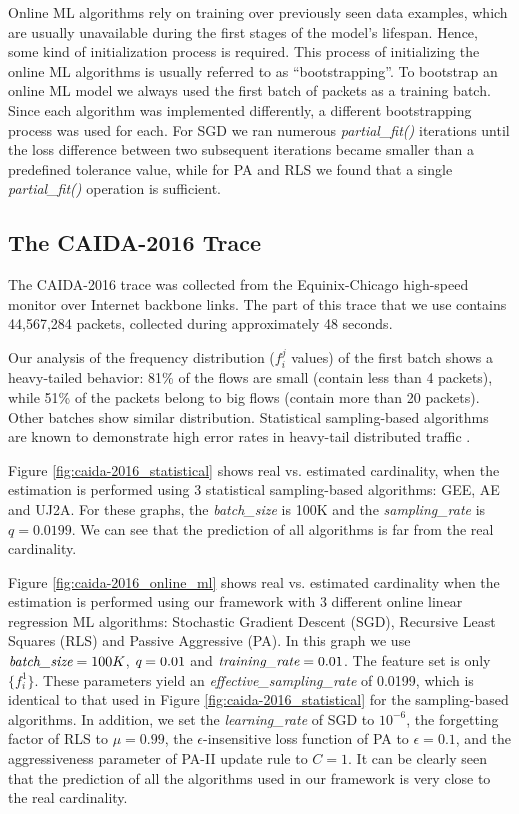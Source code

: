 			Online ML algorithms rely on training over previously seen data examples, which are usually unavailable during the first stages of the model's lifespan. Hence, some kind of initialization process is required. This process of initializing the online ML algorithms is usually referred to as ``bootstrapping''. To bootstrap an online ML model we always used the first batch of packets as a training batch. Since each algorithm was implemented differently, a different bootstrapping process was used for each. For SGD we ran numerous \emph{partial\_fit()} iterations until the loss difference between two subsequent iterations became smaller than a predefined tolerance value, while for PA and RLS we found that a single \emph{partial\_fit()} operation is sufficient.

	\subsection{The CAIDA-2016 Trace} \label{subsec:caida-2016}
		
		The CAIDA-2016 \cite{caidabackbone2016} trace was collected from the Equinix-Chicago high-speed monitor over Internet backbone links. The part of this trace that we use contains 44,567,284 packets, collected during approximately 48 seconds.
		
		Our analysis of the frequency distribution ($f_i^j$ values) of the first batch shows a heavy-tailed behavior: 81\% of the flows are small (contain less than 4 packets), while 51\% of the packets belong to big flows (contain more than 20 packets). Other batches show similar distribution. Statistical sampling-based algorithms are known to demonstrate high error rates in heavy-tail distributed traffic \cite{charikar2000towards, haas1998estimating}.
		
		Figure \ref{fig:caida-2016_statistical} shows real vs. estimated cardinality, when the estimation is performed using 3 statistical sampling-based algorithms: GEE, AE and UJ2A. For these graphs, the \emph{batch\_size} is 100K and the \emph{sampling\_rate} is $q=0.0199$. We can see that the prediction of all algorithms is far from the real cardinality.

		Figure \ref{fig:caida-2016_online_ml} shows real vs. estimated cardinality when the estimation is performed using our framework with 3 different online linear regression ML algorithms: Stochastic Gradient Descent (SGD), Recursive Least Squares (RLS) and Passive Aggressive (PA). In this graph we use $\emph{batch\_size}=100K$, $\emph{q}=0.01$ and $\emph{training\_rate}=0.01$. The feature set is only $\{f_i^1\}$. These parameters yield an \emph{effective\_sampling\_rate} of 0.0199, which is identical to that used in Figure \ref{fig:caida-2016_statistical} for the sampling-based algorithms. In addition, we set the \emph{learning\_rate} of SGD to $10^{-6}$, the forgetting factor of RLS to $\mu=0.99$, the $\epsilon$-insensitive loss function of PA to $\epsilon=0.1$, and the aggressiveness parameter of PA-II update rule to $C=1$. It can be clearly seen that the prediction of all the algorithms used in our framework is very close to the real cardinality.
		
